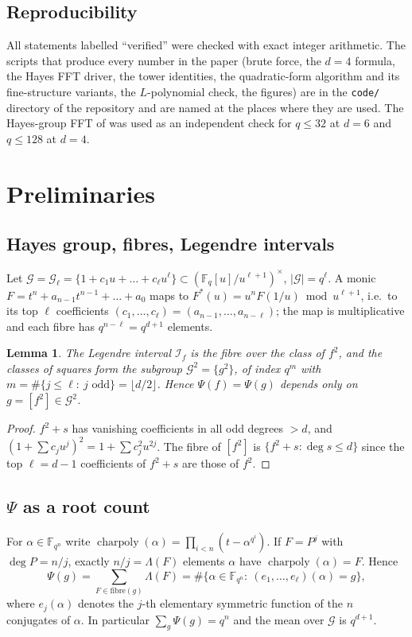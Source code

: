 \documentclass[11pt,a4paper]{amsart}
\newtheorem{lemma}[theorem]{Lemma}
\theoremstyle{definition}
\newcommand{\F}{\mathbb{F}}
\newcommand{\G}{\mathcal{G}}
\newcommand{\charpoly}{\operatorname{charpoly}}
\begin{document}
\subsection*{Reproducibility}
\begin{sloppypar}
All statements labelled ``verified'' were checked with exact integer arithmetic. The scripts that produce every number in the paper (brute force, the $d=4$ formula, the Hayes FFT driver, the tower identities, the quadratic-form algorithm and its fine-structure variants, the $L$-polynomial check, the figures) are in the \texttt{code/} directory of the repository and are named at the places where they are used. The Hayes-group FFT of \cite{Chen} was used as an independent check for $q\le32$ at $d=6$ and $q\le128$ at $d=4$.
\end{sloppypar}

\section{Preliminaries}\label{sec:prelim}

\subsection{Hayes group, fibres, Legendre intervals}
Let $\G=\G_\ell=\{1+c_1u+\dots+c_\ell u^\ell\}\subset(\F_q[u]/u^{\ell+1})^\times$, $|\G|=q^\ell$. A monic $F=t^n+a_{n-1}t^{n-1}+\dots+a_0$ maps to $F^*(u)=u^nF(1/u)\bmod u^{\ell+1}$, i.e.\ to its top $\ell$ coefficients $(c_1,\dots,c_\ell)=(a_{n-1},\dots,a_{n-\ell})$; the map is multiplicative and each fibre has $q^{n-\ell}=q^{d+1}$ elements.

\begin{lemma}\label{lem:legendre}
The Legendre interval $\mathcal I_f$ is the fibre over the class of $f^2$, and the classes of squares form the subgroup $\G^2=\{g^2\}$, of index $q^{m}$ with $m=\#\{j\le\ell:\ j\text{ odd}\}=\lfloor d/2\rfloor$. Hence $\Psi(f)=\Psi(g)$ depends only on $g=[f^2]\in\G^2$.
\end{lemma}
\begin{proof}
$f^2+s$ has vanishing coefficients in all odd degrees $>d$, and $(1+\sum c_ju^j)^2=1+\sum c_j^2u^{2j}$. The fibre of $[f^2]$ is $\{f^2+s:\deg s\le d\}$ since the top $\ell=d-1$ coefficients of $f^2+s$ are those of $f^2$.
\end{proof}

\subsection{\texorpdfstring{$\Psi$}{Psi} as a root count}
For $\alpha\in\F_{q^n}$ write $\charpoly(\alpha)=\prod_{i<n}(t-\alpha^{q^i})$. If $F=P^j$ with $\deg P=n/j$, exactly $n/j=\Lambda(F)$ elements $\alpha$ have $\charpoly(\alpha)=F$. Hence
\begin{equation}\label{eq:rootcount}
\Psi(g)=\sum_{F\in\mathrm{fibre}(g)}\Lambda(F)=\#\{\alpha\in\F_{q^n}:\ (e_1,\dots,e_\ell)(\alpha)=g\},
\end{equation}
where $e_j(\alpha)$ denotes the $j$-th elementary symmetric function of the $n$ conjugates of $\alpha$. In particular $\sum_g\Psi(g)=q^n$ and the mean over $\G$ is $q^{d+1}$.
\end{document}

